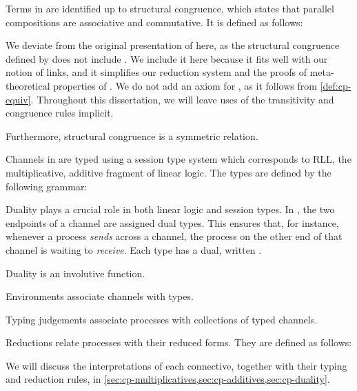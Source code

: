 Terms in \rcp are identified up to structural congruence, which states that
parallel compositions  are associative and commutative.
It is defined as follows:

We deviate from the original presentation of \cp here, as the structural
congruence defined by  does not include \cpEquivLinkComm.
We include it here because it fits well with our notion of links, and it
simplifies our reduction system and the proofs of meta-theoretical properties of
\cp. 
We do not add an axiom for , as it follows from
\cref{def:cp-equiv}.
Throughout this dissertation, we will leave uses of the transitivity and
congruence rules implicit.

Furthermore, structural congruence is a symmetric relation.

%
Channels in \rcp are typed using a session type system which corresponds to RLL,
the multiplicative, additive fragment of linear logic.
The types are defined by the following grammar:

Duality plays a crucial role in both linear logic and session types.
In \rcp, the two endpoints of a channel are assigned dual types.
This ensures that, for instance, whenever a process \emph{sends} across a
channel, the process on the other end of that channel is waiting to
\emph{receive}.
Each type  has a dual, written .

Duality is an involutive function.

%
Environments associate channels with types.

Typing judgements associate processes with collections of typed channels.


Reductions relate processes with their reduced forms.
They are defined as follows:



We will discuss the interpretations of each connective, together with their
typing and reduction rules, in \cref{sec:cp-multiplicatives,sec:cp-additives,sec:cp-duality}.

